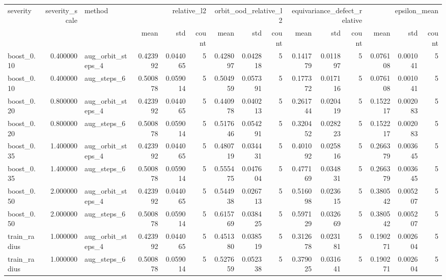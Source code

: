 \begin{tabular}{lrlrrrrrrrrrrrr}
\toprule
severity & severity_scale & method & \multicolumn{3}{r}{relative_l2} & \multicolumn{3}{r}{orbit_ood_relative_l2} & \multicolumn{3}{r}{equivariance_defect_relative} & \multicolumn{3}{r}{epsilon_mean} \\
 &  &  & mean & std & count & mean & std & count & mean & std & count & mean & std & count \\
\midrule
boost_0.10 & 0.400000 & aug_orbit_steps_4 & 0.423992 & 0.044065 & 5 & 0.428097 & 0.042818 & 5 & 0.141779 & 0.011897 & 5 & 0.076108 & 0.001041 & 5 \\
boost_0.10 & 0.400000 & aug_steps_6 & 0.500878 & 0.059014 & 5 & 0.504959 & 0.057391 & 5 & 0.177372 & 0.017116 & 5 & 0.076108 & 0.001041 & 5 \\
boost_0.20 & 0.800000 & aug_orbit_steps_4 & 0.423992 & 0.044065 & 5 & 0.440978 & 0.040213 & 5 & 0.261744 & 0.020419 & 5 & 0.152217 & 0.002083 & 5 \\
boost_0.20 & 0.800000 & aug_steps_6 & 0.500878 & 0.059014 & 5 & 0.517646 & 0.054291 & 5 & 0.320452 & 0.028223 & 5 & 0.152217 & 0.002083 & 5 \\
boost_0.35 & 1.400000 & aug_orbit_steps_4 & 0.423992 & 0.044065 & 5 & 0.480719 & 0.034431 & 5 & 0.401092 & 0.025816 & 5 & 0.266379 & 0.003645 & 5 \\
boost_0.35 & 1.400000 & aug_steps_6 & 0.500878 & 0.059014 & 5 & 0.555475 & 0.047604 & 5 & 0.477169 & 0.034831 & 5 & 0.266379 & 0.003645 & 5 \\
boost_0.50 & 2.000000 & aug_orbit_steps_4 & 0.423992 & 0.044065 & 5 & 0.544938 & 0.026713 & 5 & 0.516098 & 0.023615 & 5 & 0.380542 & 0.005207 & 5 \\
boost_0.50 & 2.000000 & aug_steps_6 & 0.500878 & 0.059014 & 5 & 0.615769 & 0.038425 & 5 & 0.597129 & 0.032669 & 5 & 0.380542 & 0.005207 & 5 \\
train_radius & 1.000000 & aug_orbit_steps_4 & 0.423992 & 0.044065 & 5 & 0.451380 & 0.038519 & 5 & 0.312678 & 0.023181 & 5 & 0.190271 & 0.002604 & 5 \\
train_radius & 1.000000 & aug_steps_6 & 0.500878 & 0.059014 & 5 & 0.527659 & 0.052338 & 5 & 0.379025 & 0.031641 & 5 & 0.190271 & 0.002604 & 5 \\
\bottomrule
\end{tabular}
